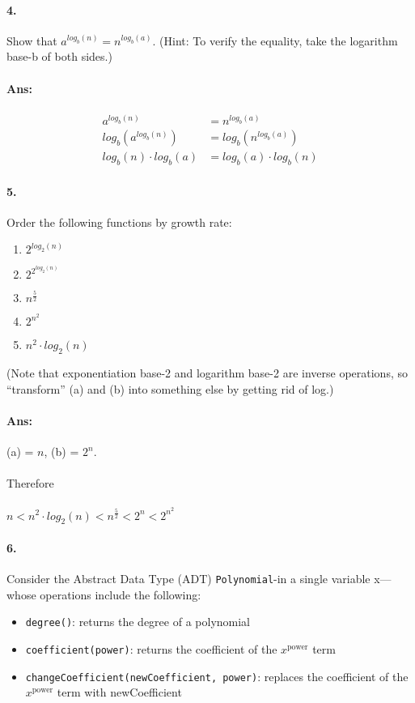 \documentclass{article}
\begin{document}
\paragraph{4.} Show that $a^{log_{b}(n)} = n^{log_{b}(a)}$. (Hint: To verify the equality, take the logarithm base-b of both sides.)

\paragraph{Ans:}
\begin{align*}
    a^{log_{b}(n)}&= n^{log_{b}(a)}\\
    log_{b}(a^{log_{b}(n)})&= log_{b}(n^{log_{b}(a)})\\
    log_{b}(n)\cdot log_b(a)&= log_{b}(a)\cdot log_{b}(n)
\end{align*}
\paragraph{5.} Order the following functions by growth rate:
\begin{enumerate}[label=(\alph*).]
    \item $2^{log_{2}(n)}$
    \item $2^{2^{log_{2}(n)}}$
    \item $n^{\frac{5}{2}}$
    \item $2^{n^{2}}$
    \item $n^2\cdot log_2 (n)$
    \end{enumerate}
    (Note that exponentiation base-2 and logarithm base-2 are inverse operations, so
    “transform” (a) and (b) into something else by getting rid of log.)
    \paragraph{Ans:} (a) = $n$, (b) = $2^{n}$. 
    \paragraph{}Therefore
    \paragraph{} $n < n^2\cdot log_2(n) <n^{\frac{5}{2}} < 2^{n} < 2^{n^{2}}$

    \paragraph{6.} Consider the Abstract Data Type (ADT) \texttt{Polynomial}-in a single variable x—whose
operations include the following:
\begin{itemize}
    \item \texttt{degree()}: returns the degree of a polynomial
    \item \texttt{coefficient(power)}: returns the coefficient of the $x^{\text{power}}$ term
    \item \texttt{changeCoefficient(newCoefficient, power)}: 
        replaces the coefficient of the $x^{\text{power}}$
        term with newCoefficient
    \end{itemize}
\end{document}
